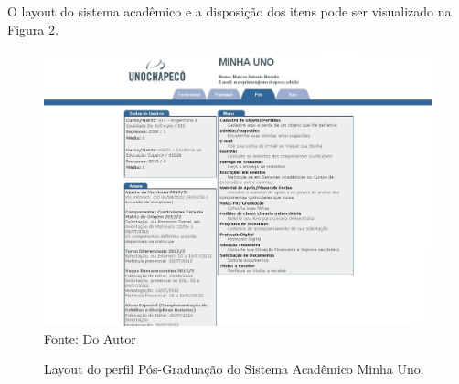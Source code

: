 O layout do sistema acadêmico e a disposição dos itens pode ser visualizado na Figura 2.

\begin{figure}[!htb]
     \centering
     \caption[Layout do Sistema - Perfil Pós-Graduação]{Layout do perfil Pós-Graduação do Sistema Acadêmico Minha Uno.}
     \includegraphics[scale=0.3]{imagens/pos.jpg}
     \\ Fonte: Do Autor
\end{figure}

